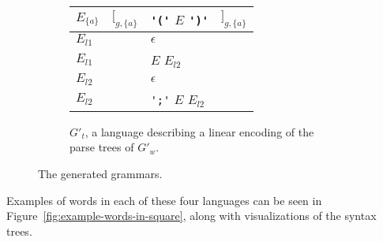 \documentclass[acmsmall,review,anonymous]{acmart}\settopmatter{printfolios=true,printccs=false,printacmref=false}
\begin{document}
\begin{figure}
\begin{subfigure}[t]{.54\linewidth}
\begin{tabular}{@{}l@{\quad$->$\quad}lll@{}}
      $E_{\{a\}}$ & $[_{g, \{a\}}$ & \verb|'('| $E$ \verb|')'| & $]_{g, \{a\}}$ \\
      \midrule
      $E_{l1}$ & & $\epsilon$ & \\
      $E_{l1}$ & & $E$ $E_{l2}$ & \\
      \midrule
      $E_{l2}$ & & $\epsilon$ & \\
      $E_{l2}$ & & \verb|';'| $E$ $E_{l2}$ & \\
      \bottomrule
    \end{tabular}
    \caption{$G'_t$, a language describing a linear encoding of the parse trees of $G'_w$.}
    \label{fig:running-example-generated:t-prime}
  \end{subfigure}%
  \caption{The generated grammars.}
  \label{fig:running-example-generated}
\end{figure}

\noindent Examples of words in each of these four languages can be seen in Figure~\ref{fig:example-words-in-square}, along with visualizations of the syntax trees.
\end{document}
